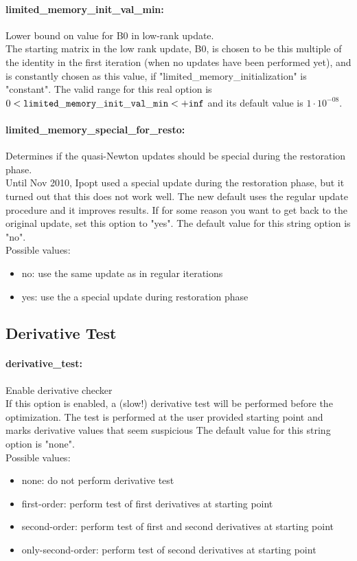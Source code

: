 \paragraph{limited\_memory\_init\_val\_min:}\label{opt:limited_memory_init_val_min} Lower bound on value for B0 in low-rank update. \\
 The starting matrix in the low rank update, B0,
is chosen to be this multiple of the identity in
the first iteration (when no updates have been
performed yet), and is constantly chosen as this
value, if "limited\_memory\_initialization" is
"constant". The valid range for this real option is 
$0 <  {\tt limited\_memory\_init\_val\_min } <  {\tt +inf}$
and its default value is $1 \cdot 10^{-08}$.


\paragraph{limited\_memory\_special\_for\_resto:}\label{opt:limited_memory_special_for_resto} Determines if the quasi-Newton updates should be special during the restoration phase. \\
 Until Nov 2010, Ipopt used a special update
during the restoration phase, but it turned out
that this does not work well.  The new default
uses the regular update procedure and it improves
results.  If for some reason you want to get back
to the original update, set this option to "yes". The default value for this string option is "no".
\\ 
Possible values:
\begin{itemize}
   \item no: use the same update as in regular iterations
   \item yes: use the a special update during restoration
phase
\end{itemize}

\subsection{Derivative Test}

\paragraph{derivative\_test:}\label{opt:derivative_test} Enable derivative checker \\
 If this option is enabled, a (slow!) derivative
test will be performed before the optimization. 
The test is performed at the user provided
starting point and marks derivative values that
seem suspicious The default value for this string option is "none".
\\ 
Possible values:
\begin{itemize}
   \item none: do not perform derivative test
   \item first-order: perform test of first derivatives at starting
point
   \item second-order: perform test of first and second derivatives at
starting point
   \item only-second-order: perform test of second derivatives at starting
point
\end{itemize}


